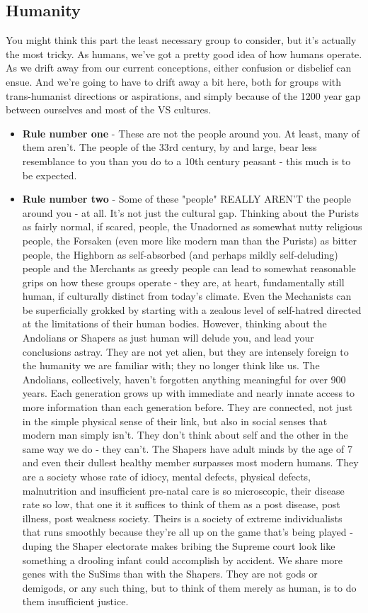 \subsection{Humanity}

You might think this part the least necessary group to consider, but
it's actually the most tricky. As humans, we've got a pretty good idea
of how humans operate. As we drift away from our current conceptions,
either confusion or disbelief can ensue. And we're going to have to
drift away a bit here, both for groups with trans-humanist directions
or aspirations, and simply because of the 1200 year gap between
ourselves and most of the VS cultures.

\begin{itemize}
\item {\bf Rule number one} - These are not the people around you. At least, many
of them aren't. The people of the 33rd century, by and large, bear
less resemblance to you than you do to a 10th century peasant - this
much is to be expected.

\item {\bf Rule number two} - Some of these "people" REALLY AREN'T the
people around you - at all. It's not just the cultural gap. Thinking
about the Purists as fairly normal, if scared, people, the Unadorned
as somewhat nutty religious people, the Forsaken (even more like
modern man than the Purists) as bitter people, the Highborn as
self-absorbed (and perhaps mildly self-deluding) people and the
Merchants as greedy people can lead to somewhat reasonable grips on
how these groups operate - they are, at heart, fundamentally still
human, if culturally distinct from today's climate. Even the
Mechanists can be superficially grokked by starting with a zealous
level of self-hatred directed at the limitations of their human
bodies. However, thinking about the Andolians or Shapers as just human
will delude you, and lead your conclusions astray. They are not yet
alien, but they are intensely foreign to the humanity we are familiar
with; they no longer think like us. The Andolians, collectively,
haven't forgotten anything meaningful for over 900 years. Each
generation grows up with immediate and nearly innate access to more
information than each generation before. They are connected, not just
in the simple physical sense of their link, but also in social senses
that modern man simply isn't. They don't think about self and the
other in the same way we do - they can't. The Shapers have adult minds
by the age of 7 and even their dullest healthy member surpasses most
modern humans. They are a society whose rate of idiocy, mental
defects, physical defects, malnutrition and insufficient pre-natal care
is so microscopic, their disease rate so low, that one it it suffices
to think of them as a post disease, post illness, post weakness
society. Theirs is a society of extreme individualists that runs
smoothly because they're all up on the game that's being played -
duping the Shaper electorate makes bribing the Supreme court look like
something a drooling infant could accomplish by accident. We share
more genes with the SuSims than with the Shapers. They are not gods or
demigods, or any such thing, but to think of them merely as human, is
to do them insufficient justice.


\end{itemize}
